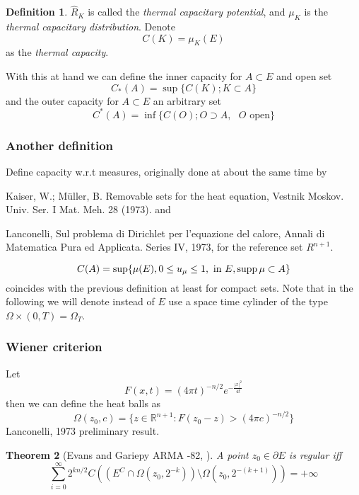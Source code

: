 \documentclass[reqno,a4paper,12pt]{amsart}
\newtheorem{theorem}{Theorem}[section]
\theoremstyle{definition}
\newtheorem{definition}[theorem]{Definition}
\numberwithin{theorem}{section} \numberwithin{equation}{section}
\newcommand{\R}{{\mathbb R}}
\begin{document}
\begin{definition}
	$\hat R_K$ is called the \emph{thermal capacitary potential}, and $\mu_K$ is the \emph{thermal capacitary distribution}. Denote
	\begin{equation} \nonumber \label{}
		C(K) = \mu_K(E)
	\end{equation}
	as the \emph{thermal capacity}.
\end{definition}
With this at hand we can define the inner capacity for $A \subset E$ and open set
\begin{equation} \nonumber \label{}
	C_\ast (A) = \sup \{C(K); K \subset A\}
\end{equation}
and the outer capacity for $A \subset E$ an arbitrary set
\begin{equation} \label{}
	C^\ast (A) = \inf \{C(O); O \supset A, \text{ $O$ open}\}
\end{equation}
\subsubsection{Another definition}
Define capacity w.r.t measures, originally done at about the same time by

\cite{KM} Kaiser, W.; Müller, B. Removable sets for the heat equation, Vestnik Moskov. Univ. Ser. I Mat. Meh. 28 (1973). and

\cite{La1} Lanconelli, Sul problema di Dirichlet per l'equazione del calore, Annali di Matematica Pura ed Applicata. Series IV, 1973, for the reference set $R^{n+1}$.

\begin{equation} \label{measure capacity definition}
	C(A) = \sup \{ \mu(E), 0 \leq u_\mu \leq 1, \text{ in $E$}, \operatorname*{supp} \mu \subset A\}
\end{equation}
coincides with the previous definition at least for compact sets. Note that in the following we will denote instead of $E$ use a space time cylinder of the type $\Omega \times (0,T) = \Omega_T$.
\subsubsection{Wiener criterion}
Let
\begin{equation} \nonumber \label{}
	F(x,t) = (4 \pi t)^{-n/2} e^{-\frac{|x|^2}{4t}}
\end{equation}
then we can define the heat balls as
\begin{equation} \nonumber \label{}
	\Omega(z_0,c) = \{z \in \R^{n+1}: F(z_0-z) > (4 \pi c)^{-n/2}\}
\end{equation}
Lanconelli, 1973 preliminary result.
\begin{theorem}[Evans and Gariepy ARMA -82, \cite{EG}]
	A point $z_0 \in \partial E$ is regular iff
	\begin{equation} \nonumber \label{}
		\sum_{i=0}^\infty 2^{kn/2} C((E^C \cap \Omega(z_0,2^{-k})) \setminus \Omega(z_0,2^{-(k+1)})) = + \infty
	\end{equation}
\end{theorem}
\end{document}
